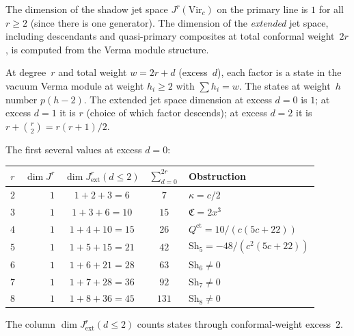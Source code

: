 \begin{computation}
\label{comp:virasoro-jet-dimensions}
The dimension of the shadow jet space $J^r(\mathrm{Vir}_c)$
on the primary line is $1$ for all $r \geq 2$ (since
there is one generator). The dimension of the
\emph{extended} jet space, including descendants and
quasi-primary composites at total conformal weight~$2r$,
is computed from the Verma module structure.

At degree~$r$ and total weight $w = 2r + d$ (excess~$d$),
each factor is a state in the vacuum Verma module at
weight $h_i \geq 2$ with $\sum h_i = w$. The states
at weight~$h$ number $p(h-2)$. The extended jet space
dimension at excess $d = 0$ is $1$; at excess $d = 1$ it
is $r$ (choice of which factor descends); at excess
$d = 2$ it is $r + \binom{r}{2} = r(r+1)/2$.

The first several values at excess $d = 0$:

\begin{center}
\renewcommand{\arraystretch}{1.4}
\begin{tabular}{crccl}
\toprule
$r$ & $\dim J^r$ & $\dim J^r_{\mathrm{ext}}(d{\leq}2)$
 & $\sum_{d=0}^{2r}$ & Obstruction \\
\midrule
$2$ & $1$ & $1 + 2 + 3 = 6$ & $7$
 & $\kappa = c/2$ \\
$3$ & $1$ & $1 + 3 + 6 = 10$ & $15$
 & $\mathfrak{C} = 2x^3$ \\
$4$ & $1$ & $1 + 4 + 10 = 15$ & $26$
 & $Q^{\mathrm{ct}} = 10/(c(5c{+}22))$ \\
$5$ & $1$ & $1 + 5 + 15 = 21$ & $42$
 & $\mathrm{Sh}_5 = -48/(c^2(5c{+}22))$ \\
$6$ & $1$ & $1 + 6 + 21 = 28$ & $63$
 & $\mathrm{Sh}_6 \neq 0$ \\
$7$ & $1$ & $1 + 7 + 28 = 36$ & $92$
 & $\mathrm{Sh}_7 \neq 0$ \\
$8$ & $1$ & $1 + 8 + 36 = 45$ & $131$
 & $\mathrm{Sh}_8 \neq 0$ \\
\bottomrule
\end{tabular}
\end{center}

\noindent The column $\dim J^r_{\mathrm{ext}}(d{\leq}2)$
counts states through conformal-weight excess~$2$.
\end{computation}

